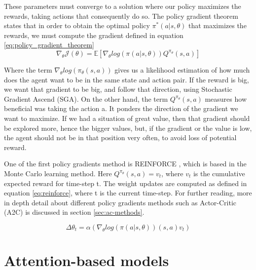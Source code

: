 These parameters must converge to a solution where our policy maximizes the rewards, taking actions that consequently do so. The policy gradient theorem states that in order to obtain the optimal policy $\pi^*(a|s, \theta)$ that maximizes the rewards, we must compute the gradient defined in equation \ref{eq:policy_gradient_theorem}
\begin{equation} \label{eq:policy_gradient_theorem}
	\nabla_{\theta}\mathcal{J}(\theta) = \mathbb{E}[\nabla_{\theta} log (\pi(a|s, \theta)) {Q}^{\pi_{\theta}}(s,a)]
\end{equation}

Where the term $\nabla_{\theta} log (\pi_{\theta}(s,a))$ gives us a likelihood estimation of how much does the agent want to be in the same state and action pair. If the reward is big, we want that gradient to be big, and follow that direction, using Stochastic Gradient Ascend (SGA). On the other hand, the term ${Q}^{\pi_{\theta}}(s,a)$ measures how beneficial was taking the action a. It ponders the direction of the gradient we want to maximize. If we had a situation of great value, then that gradient should be explored more, hence the bigger values, but, if the gradient or the value is low, the agent should not be in that position very often, to avoid loss of potential reward.

One of the first policy gradients method is REINFORCE \cite{lehmann2024definitive}, which is based in the Monte Carlo learning method. Here ${Q}^{\pi_{\theta}}(s,a) = v_t$, where $v_t$ is the cumulative expected reward for time-step t. The weight updates are computed as defined in equation \ref{eq:reinforce}, where t is the current time-step. For further reading, more in depth detail about different policy gradients methods such as Actor-Critic (A2C) \cite{wang2022recursive} is discussed in section \ref{sec:ac-methods}.

\begin{equation}\label{eq:reinforce}
	\Delta\theta_{t} = \alpha(\nabla_{\theta} log (\pi(a|s, \theta))(s,a)v_t)
\end{equation}

\section{Attention-based models}
\label{sec:attention}

